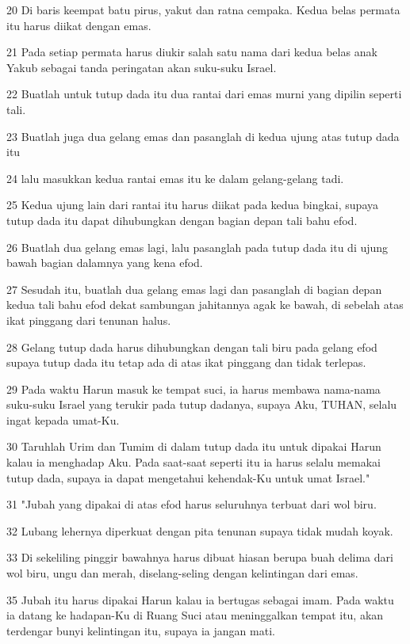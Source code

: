 \par 20 Di baris keempat batu pirus, yakut dan ratna cempaka. Kedua belas permata itu harus diikat dengan emas.
\par 21 Pada setiap permata harus diukir salah satu nama dari kedua belas anak Yakub sebagai tanda peringatan akan suku-suku Israel.
\par 22 Buatlah untuk tutup dada itu dua rantai dari emas murni yang dipilin seperti tali.
\par 23 Buatlah juga dua gelang emas dan pasanglah di kedua ujung atas tutup dada itu
\par 24 lalu masukkan kedua rantai emas itu ke dalam gelang-gelang tadi.
\par 25 Kedua ujung lain dari rantai itu harus diikat pada kedua bingkai, supaya tutup dada itu dapat dihubungkan dengan bagian depan tali bahu efod.
\par 26 Buatlah dua gelang emas lagi, lalu pasanglah pada tutup dada itu di ujung bawah bagian dalamnya yang kena efod.
\par 27 Sesudah itu, buatlah dua gelang emas lagi dan pasanglah di bagian depan kedua tali bahu efod dekat sambungan jahitannya agak ke bawah, di sebelah atas ikat pinggang dari tenunan halus.
\par 28 Gelang tutup dada harus dihubungkan dengan tali biru pada gelang efod supaya tutup dada itu tetap ada di atas ikat pinggang dan tidak terlepas.
\par 29 Pada waktu Harun masuk ke tempat suci, ia harus membawa nama-nama suku-suku Israel yang terukir pada tutup dadanya, supaya Aku, TUHAN, selalu ingat kepada umat-Ku.
\par 30 Taruhlah Urim dan Tumim di dalam tutup dada itu untuk dipakai Harun kalau ia menghadap Aku. Pada saat-saat seperti itu ia harus selalu memakai tutup dada, supaya ia dapat mengetahui kehendak-Ku untuk umat Israel."
\par 31 "Jubah yang dipakai di atas efod harus seluruhnya terbuat dari wol biru.
\par 32 Lubang lehernya diperkuat dengan pita tenunan supaya tidak mudah koyak.
\par 33 Di sekeliling pinggir bawahnya harus dibuat hiasan berupa buah delima dari wol biru, ungu dan merah, diselang-seling dengan kelintingan dari emas.
\par 35 Jubah itu harus dipakai Harun kalau ia bertugas sebagai imam. Pada waktu ia datang ke hadapan-Ku di Ruang Suci atau meninggalkan tempat itu, akan terdengar bunyi kelintingan itu, supaya ia jangan mati.
